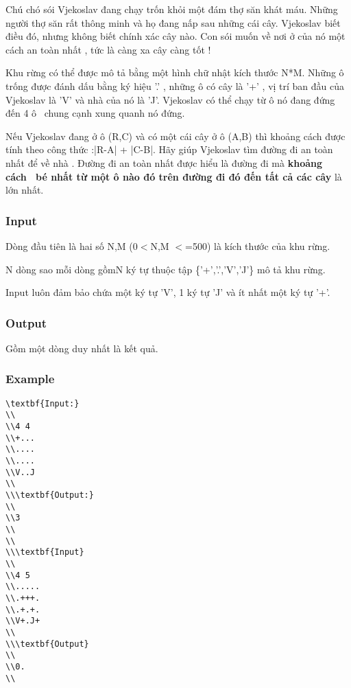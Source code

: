 



   Chú chó sói Vjekoslav đang chạy trốn khỏi một đám thợ săn khát máu. Những người thợ săn rất thông minh và họ đang nấp sau những cái cây. Vjekoslav biết điều đó, nhưng không biết chính xác cây nào. Con sói muốn về nơi ở của nó một cách an toàn nhất , tức là càng xa cây càng tốt !  

   Khu rừng có thể được mô tả bằng một hình chữ nhật kích thước N*M. Những ô trống được đánh dấu bằng ký hiệu '.' , những ô có cây là '+' , vị trí ban đầu của Vjekoslav là 'V' và nhà của nó là 'J'. Vjekoslav có thể chạy từ ô nó đang đứng đến 4 ô  chung cạnh xung quanh nó đứng.  

   Nếu Vjekoslav đang ở ô (R,C) và có một cái cây ở ô (A,B) thì khoảng cách được tính theo công thức :|R-A| + |C-B|. Hãy giúp Vjekoslav tìm đường đi an toàn nhất để về nhà . Đường đi an toàn nhất được hiểu là đường đi mà   \textbf{    khoảng cách  bé nhất từ một ô nào đó trên đường đi đó đến tất cả các cây   }   là lớn nhất.  

\subsubsection{   Input  }

   Dòng đầu tiên là hai số N,M (0$<$N,M $<$=500) là kích thước của khu rừng.  

   N dòng sao mỗi dòng gồmN ký tự thuộc tập \{'+','.','V','J'\} mô tả khu rừng.  

   Input luôn đảm bảo chứa một ký tự 'V', 1 ký tự 'J' và ít nhất một ký tự '+'.  

\subsubsection{   Output  }

   Gồm một dòng duy nhất là kết quả.  

\subsubsection{   Example  }
\begin{verbatim}
\textbf{Input:}
\\
\\4 4
\\+...
\\....
\\....
\\V..J
\\
\\\textbf{Output:}
\\
\\3
\\
\\
\\\textbf{Input}
\\
\\4 5
\\.....
\\.+++.
\\.+.+.
\\V+.J+
\\
\\\textbf{Output}
\\
\\0.
\\\end{verbatim}